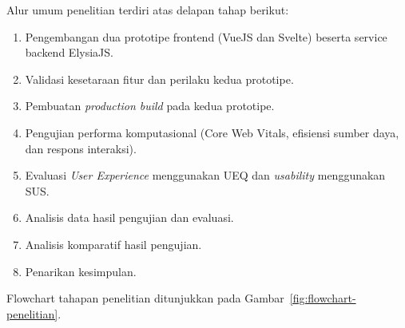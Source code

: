\documentclass[12pt,a4paper]{report}
\begin{document}
Alur umum penelitian terdiri atas delapan tahap berikut:
\begin{enumerate}
    \item Pengembangan dua prototipe frontend (VueJS dan Svelte) beserta service backend ElysiaJS.
    \item Validasi kesetaraan fitur dan perilaku kedua prototipe.
    \item Pembuatan \textit{production build} pada kedua prototipe.
    \item Pengujian performa komputasional (Core Web Vitals, efisiensi sumber daya, dan respons interaksi).
    \item Evaluasi \textit{User Experience} menggunakan UEQ dan \textit{usability} menggunakan SUS.
    \item Analisis data hasil pengujian dan evaluasi.
    \item Analisis komparatif hasil pengujian.
    \item Penarikan kesimpulan.
\end{enumerate}

Flowchart tahapan penelitian ditunjukkan pada Gambar~\ref{fig:flowchart-penelitian}.
\end{document}
